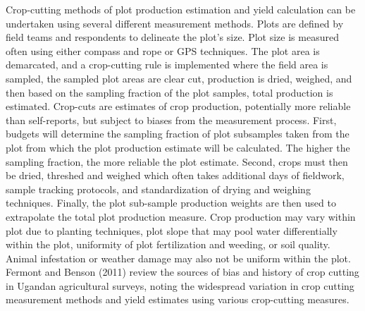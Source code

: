 \documentclass[
]{book}
\begin{document}
Crop-cutting methods of plot production estimation and yield calculation can be undertaken using several different measurement methods. Plots are defined by field teams and respondents to delineate the plot's size. Plot size is measured often using either compass and rope or GPS techniques. The plot area is demarcated, and a crop-cutting rule is implemented where the field area is sampled, the sampled plot areas are clear cut, production is dried, weighed, and then based on the sampling fraction of the plot samples, total production is estimated. Crop-cuts are estimates of crop production, potentially more reliable than self-reports, but subject to biases from the measurement process. First, budgets will determine the sampling fraction of plot subsamples taken from the plot from which the plot production estimate will be calculated. The higher the sampling fraction, the more reliable the plot estimate. Second, crops must then be dried, threshed and weighed which often takes additional days of fieldwork, sample tracking protocols, and standardization of drying and weighing techniques. Finally, the plot sub-sample production weights are then used to extrapolate the total plot production measure. Crop production may vary within plot due to planting techniques, plot slope that may pool water differentially within the plot, uniformity of plot fertilization and weeding, or soil quality. Animal infestation or weather damage may also not be uniform within the plot. Fermont and Benson (2011) review the sources of bias and history of crop cutting in Ugandan agricultural surveys, noting the widespread variation in crop cutting measurement methods and yield estimates using various crop-cutting measures.
\end{document}
